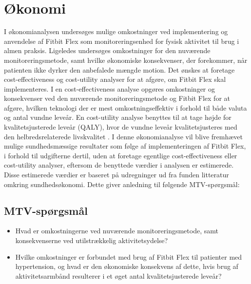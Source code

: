 \section{Økonomi}\label{sec:metode_oeko}
I økonomianalysen undersøges mulige omkostninger ved implementering og anvendelse af Fitbit Flex som monitoreringsenhed for fysisk aktivitet til brug i almen praksis.
Ligeledes undersøges omkostninger for den nuværende monitoreringsmetode, samt hvilke økonomiske konsekvenser, der forekommer, når patienten ikke dyrker den anbefalede mængde motion.
Det ønskes at foretage cost-effectiveness og cost-utility analyser for at afgøre, om Fitbit Flex skal implementeres. I en cost-effectiveness analyse opgøres omkostninger og konsekvenser ved den nuværende monitoreringsmetode og Fitbit Flex for at afgøre, hvilken teknologi der er mest omkostningseffektiv i forhold til både valuta og antal vundne leveår. En cost-utility analyse benyttes til at tage højde for kvalitetsjusterede leveår (QALY), hvor de vundne leveår kvalitetsjusteres med den helbredsrelaterede livskvalitet \citep{mtvhaandbog}.
I denne økonomianalyse vil blive fremhævet mulige sundhedsmæssige resultater som følge af implementeringen af Fitbit Flex, i forhold til udgifterne dertil, uden at foretage egentlige cost-effectiveness eller cost-utility analyser, eftersom de benyttede værdier i analysen er estimerede.  
Disse estimerede værdier er baseret på udregninger ud fra funden litteratur omkring sundhedsøkonomi. Dette giver anledning til følgende MTV-spørgsmål: 

\subsection{MTV-spørgsmål}
 
\begin{itemize}
\item Hvad er omkostningerne ved nuværende monitoreringsmetode, samt konsekvenserne ved utilstrækkelig aktivitetsydelse? 
\item Hvilke omkostninger er forbundet med brug af Fitbit Flex til patienter med hypertension, og hvad er den økonomiske konsekvens af dette, hvis brug af aktivitetsarmbånd resulterer i et øget antal kvalitetsjusterede leveår?
\end{itemize}


